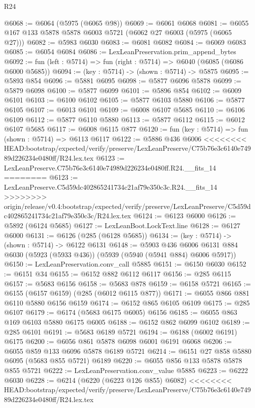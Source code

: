 \begin{lexlean}{R24}
\begin{coremodule}
{{{{{{{{{{{{{{{{{{{{{{{{{{{{{{{{{{{{{{{{{{{{{{{{{{{{{{{{{{{{{{{{{{{{{{{{{{{{{{{{{{{{{{{{{{{{{{{{{{{{{{{{{{{{{{{{{{{{{{{{{{{{{{{{{{{{{{{{{{{{{{{{{{{{{{{{{{{{{{{{{{{{{{{{{{{{{{{{{{{{{{{{{{{{{{{{{{{@6068 := @6064 (@5975 (@6065 @98))
@6069 := @6061 @6068
@6081 := @6055 @167 @133 @5878 @5878 @6003 @5721 (@6062 @27 @6003 (@5975 (@6065 @27)))
@6082 := @5983 @6030
@6083 := @6081 @6082
@6084 := @6069 @6083
@6085 := @6054 @6084
@6086 := LexLeanPreservation.prim_append_bytes
@6092 := fun (left : @5714) => fun (right : @5714) => @6040 (@6085 (@6086 @6000 @5685))
@6094 := (key : @5714) -> (shown : @5714) -> @5875
@6095 := @5893 @854
@6096 := @5881 @6095
@6098 := @5877 @6096 @5878
@6099 := @5879 @6098
@6100 := @5877 @6099
@6101 := @5896 @854
@6102 := @6009 @6101
@6103 := @6100 @6102
@6105 := @5877 @6103 @5880
@6106 := @5877 @6105
@6107 := @6013 @6101
@6109 := @6008 @6107 @5685
@6110 := @6106 @6109
@6112 := @5877 @6110 @5880
@6113 := @5877 @6112
@6115 := @6012 @6107 @5685
@6117 := @6008 @6115 @877
@6120 := fun (key : @5714) => fun (shown : @5714) => @6113 @6117
@6122 := @5886 @436 @6006
<<<<<<<< HEAD:bootstrap/expected/verify/preserve/LexLeanPreserve/C75b76e3c6140e74989d226234e0480ff/R24.lex.tex
@6123 := LexLeanPreserve.C75b76e3c6140e74989d226234e0480ff.R24.__fits_14
========
@6123 := LexLeanPreserve.C5d59dc402865241734c21af79e350c3c.R24.__fits_14
>>>>>>>> origin/release/v0.4:bootstrap/expected/verify/preserve/LexLeanPreserve/C5d59dc402865241734c21af79e350c3c/R24.lex.tex
@6124 := @6123 @6000
@6126 := @5892 (@6124 @5685)
@6127 := LexLeanBoot.LockText.line
@6128 := @6127 @6000
@6131 := @6126 (@285 (@6128 @5685))
@6134 := (key : @5714) -> (shown : @5714) -> @6122 @6131
@6148 := @5903
    @436
    @6006
    @6131
    @884
    @6030
    (@5923 (@5933 @436))
    (@5939 (@5940 (@5941 @884) @6006 @5917))
@6150 := LexLeanPreservation.conv_call @5885
@6151 := @6150 @6030
@6152 := @6151 @34
@6155 := @6152 @882 @6112 @6117
@6156 := @285 @6115
@6157 := @5683 @6156
@6158 := @5683 @878
@6159 := @6158 @5721
@6165 := @6155 (@6157 @6159) (@285 (@6012 @6115 @877))
@6171 := @6055 @866 @881 @6110 @5880 @6156 @6159
@6174 := @6152 @865 @6105 @6109
@6175 := @285 @6107
@6179 := @6174 (@5683 @6175 @6005) @6156
@6185 := @6055 @863 @169 @6103 @5880 @6175 @6005
@6188 := @6152 @862 @6099 @6102
@6189 := @285 @6101
@6191 := @5683 @6189 @5721
@6194 := @6188 (@6002 @6191) @6175
@6200 := @6056 @861 @5878 @6098 @6001 @6191 @6068
@6206 := @6055 @859 @133 @6096 @5878 @6189 @5721
@6214 := @6151 @27 @858 @5880 @6095 (@5683 @855 @5721) @6189
@6220 := @6055 @856 @133 @5878 @5878 @855 @5721
@6222 := LexLeanPreservation.conv_value @5885
@6223 := @6222 @6030
@6228 := @6214 (@6220 (@6223 @126 @855) @6082)
<<<<<<<< HEAD:bootstrap/expected/verify/preserve/LexLeanPreserve/C75b76e3c6140e74989d226234e0480ff/R24.lex.tex
}}}}}}}}}}}}}}}}}}}}}}}}}}}}}}}}}}}}}}}}}}}}}}}}}}}}}}}}}}}}}}}}}}}}}}}}}}}}}}}}}}}}}}}}}}}}}}}}}}}}}}}}}}}}}}}}}}}}}}}}}}}}}}}}}}}}}}}}}}}}}}}}}}}}}}}}}}}}}}}}}}}}}}}}}}}}}}}}}}}}}}}}}}}}}}}}}}}
\end{coremodule}
\end{lexlean}
